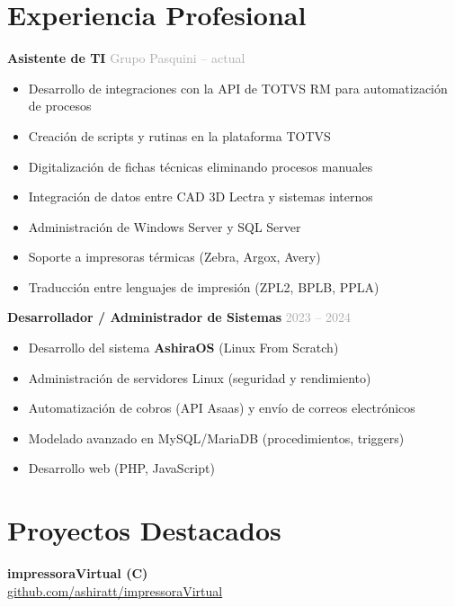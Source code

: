 \documentclass[11pt,a4paper]{article}
\begin{document}
\section{Experiencia Profesional}

\textbf{Asistente de TI} \hfill {\small\textcolor{darkgray}{Grupo Pasquini -- actual}}

\begin{itemize}
    \item Desarrollo de integraciones con la API de TOTVS RM para automatización de procesos
    \item Creación de scripts y rutinas en la plataforma TOTVS
    \item Digitalización de fichas técnicas eliminando procesos manuales
    \item Integración de datos entre CAD 3D Lectra y sistemas internos
    \item Administración de Windows Server y SQL Server
    \item Soporte a impresoras térmicas (Zebra, Argox, Avery)
    \item Traducción entre lenguajes de impresión (ZPL2, BPLB, PPLA)
\end{itemize}

\vspace{4pt}

\textbf{Desarrollador / Administrador de Sistemas} \hfill {\small\textcolor{darkgray}{2023 -- 2024}}

\begin{itemize}
    \item Desarrollo del sistema \textbf{AshiraOS} (Linux From Scratch)
    \item Administración de servidores Linux (seguridad y rendimiento)
    \item Automatización de cobros (API Asaas) y envío de correos electrónicos
    \item Modelado avanzado en MySQL/MariaDB (procedimientos, triggers)
    \item Desarrollo web (PHP, JavaScript)
\end{itemize}

\section{Proyectos Destacados}

\textbf{impressoraVirtual (C)}\\
\href{https://github.com/ashiratt/impressoraVirtual}{github.com/ashiratt/impressoraVirtual}
\end{document}
